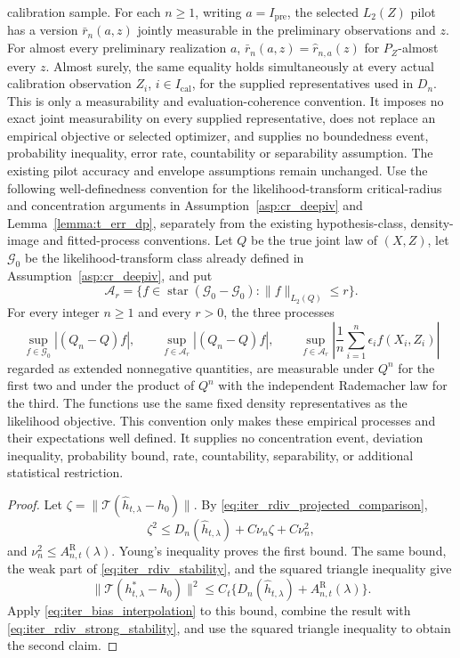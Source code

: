 \begin{lemma}
calibration sample. For each $n\geqslant1$, writing $a=I_{\mathrm{pre}}$, the selected $L_2(Z)$ pilot has a version $\bar r_n(a,z)$ jointly measurable in the preliminary observations and $z$. For almost every preliminary realization $a$, $\bar r_n(a,z)=\hat r_{n,a}(z)$ for $P_Z$-almost every $z$. Almost surely, the same equality holds simultaneously at every actual calibration observation $Z_i$, $i\in I_{\mathrm{cal}}$, for the supplied representatives used in $D_n$. This is only a measurability and evaluation-coherence convention. It imposes no exact joint measurability on every supplied representative, does not replace an empirical objective or selected optimizer, and supplies no boundedness event, probability inequality, error rate, countability or separability assumption. The existing pilot accuracy and envelope assumptions remain unchanged. Use the following well-definedness convention for the likelihood-transform critical-radius and concentration arguments in Assumption~\ref{asp:cr_deepiv} and Lemma~\ref{lemma:t_err_dp}, separately from the existing hypothesis-class, density-image and fitted-process conventions. Let $Q$ be the true joint law of $(X,Z)$, let $\mathcal G_0$ be the likelihood-transform class already defined in Assumption~\ref{asp:cr_deepiv}, and put \[ \mathcal A_r=\{f\in\operatorname{star}(\mathcal G_0-\mathcal G_0):\|f\|_{L_2(Q)}\leqslant r\}. \] For every integer $n\geqslant1$ and every $r>0$, the three processes \[ \sup_{f\in\mathcal G_0}|(Q_n-Q)f|,\qquad \sup_{f\in\mathcal A_r}|(Q_n-Q)f|,\qquad \sup_{f\in\mathcal A_r}\left|\frac1n\sum_{i=1}^n\epsilon_i f(X_i,Z_i)\right| \] regarded as extended nonnegative quantities, are measurable under $Q^n$ for the first two and under the product of $Q^n$ with the independent Rademacher law for the third. The functions use the same fixed density representatives as the likelihood objective. This convention only makes these empirical processes and their expectations well defined. It supplies no concentration event, deviation inequality, probability bound, rate, countability, separability, or additional statistical restriction.
\end{lemma}
\begin{proof}
Let $\zeta=\|\mathcal T(\hat h_{t,\lambda}-h_0)\|$. By
\eqref{eq:iter_rdiv_projected_comparison},
\[
\zeta^2 \leqslant D_n(\hat h_{t,\lambda}) +C\nu_n\zeta+C\nu_n^2,
\]
and $\nu_n^2\leqslant A_{n,t}^{\mathrm R}(\lambda)$.
Young's inequality proves the first bound. The same bound, the weak part of
\eqref{eq:iter_rdiv_stability}, and the squared triangle inequality give
\[
\|\mathcal T(h_{t,\lambda}^*-h_0)\|^2
\leqslant C_t\{D_n(\hat h_{t,\lambda})+A_{n,t}^{\mathrm R}(\lambda)\}.
\]
Apply \eqref{eq:iter_bias_interpolation} to this bound, combine the result
with \eqref{eq:iter_rdiv_strong_stability}, and use the squared triangle
inequality to obtain the second claim.
\end{proof}

